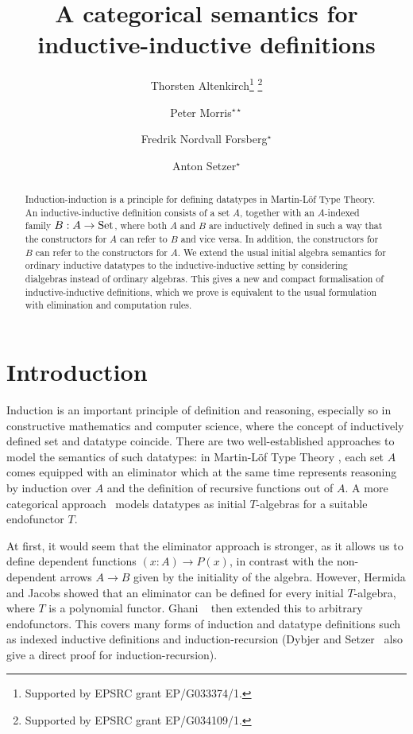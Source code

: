 \documentclass[orivec,envcountsame, ,envcountsect]{llncs}
\title{A categorical semantics for inductive-inductive definitions}
\author{Thorsten Altenkirch\inst{1}\thanks{Supported by EPSRC grant EP/G033374/1.}\fnmsep
                                   \thanks{Supported by EPSRC grant EP/G034109/1.}
\and Peter Morris\inst{1}$^{\star\star}$
\and Fredrik Nordvall Forsberg\inst{2}$^{\star}$
\and Anton Setzer\inst{2}$^{\star}$}
\institute{School of Computer Science, University of Nottingham
      \and Department of Computer Science, Swansea University}
\begin{document}
\maketitle

\begin{abstract}
  Induction-induction is a principle for defining datatypes in
  Martin-L\"of Type Theory. An inductive-inductive definition consists
  of a set $A$, together with an $A$-indexed family $B : A \to \text{Set}$,
  where both $A$ and $B$ are inductively defined in such a way that
  the constructors for $A$ can refer to $B$ and vice versa. In
  addition, the constructors for $B$ can refer to the constructors for
  $A$.
%
  We extend the usual initial algebra semantics for ordinary
  inductive datatypes to the inductive-inductive setting by
  considering dialgebras instead of ordinary algebras. This gives a
  new and compact formalisation of inductive-inductive definitions,
  which we prove is equivalent to the usual formulation with
  elimination and computation rules.
\end{abstract}

\section{Introduction}

Induction is an important principle of definition and reasoning,
especially so in constructive mathematics and computer science, where
the concept of inductively defined set and datatype coincide. There
are two well-established approaches to model the semantics of such
datatypes: in Martin-L\"of Type Theory
\cite{martinlof1984bibliopolis}, each set $A$ comes equipped with an
eliminator which at the same time represents reasoning by induction
over $A$ and the definition of recursive functions out of $A$.  A more
categorical approach~\cite{goguenThatcherWagnerWright1977initialAlgebra}
models datatypes as initial $T$-algebras for a suitable endofunctor
$T$.

At first, it would seem that the eliminator approach is stronger, as
it allows us to define dependent functions $(x : A) \to P(x)$, in
contrast with the non-dependent arrows $A \to B$ given by the
initiality of the algebra. However, Hermida and Jacobs
\cite{hermidaJacobs1998initInduction} showed that an eliminator can be
defined for every initial $T$-algebra, where $T$ is a polynomial
functor.  Ghani \etal\ \cite{ghaniJohannFumex2010fibind} then extended
this to arbitrary endofunctors.  This covers many forms of induction
and datatype definitions such as indexed inductive definitions
\cite{dybjer1994indfam} and induction-recursion
\cite{dybjersetzer1999finax} (Dybjer and
Setzer~\cite{dybjersetzer2003inalg} also give a direct proof for
induction-recursion).
\end{document}
